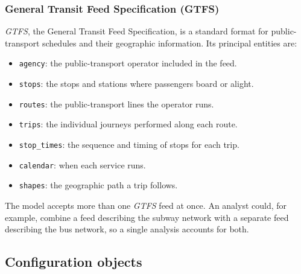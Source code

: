 \documentclass{article}
\begin{document}
\subsubsection*{General Transit Feed Specification (GTFS)}
\emph{GTFS}, the General Transit Feed Specification, is a standard format for public-transport schedules and their geographic information. Its principal entities are:
\begin{itemize}
    \item \texttt{agency}: the public-transport operator included in the feed.
    \item \texttt{stops}: the stops and stations where passengers board or alight.
    \item \texttt{routes}: the public-transport lines the operator runs.
    \item \texttt{trips}: the individual journeys performed along each route.
    \item \texttt{stop\_times}: the sequence and timing of stops for each trip.
    \item \texttt{calendar}: when each service runs.
    \item \texttt{shapes}: the geographic path a trip follows.
\end{itemize}
The model accepts more than one \emph{GTFS} feed at once. An analyst could, for example, combine a feed describing the subway network with a separate feed describing the bus network, so a single analysis accounts for both.

\subsection{Configuration objects}
\end{document}
